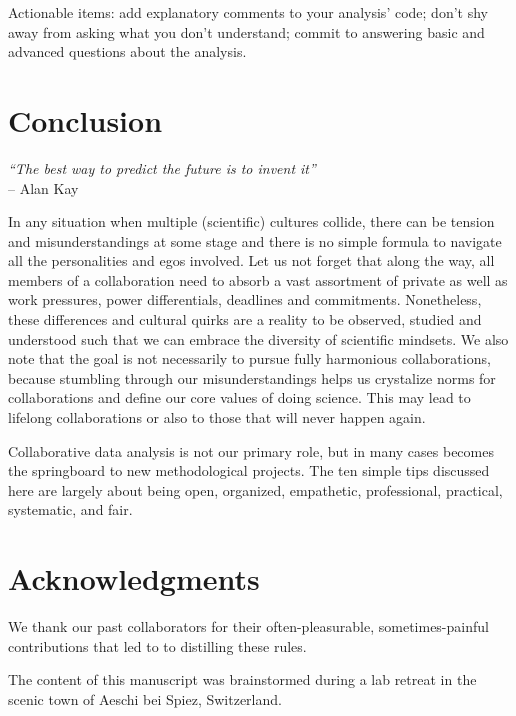 \documentclass{article}
\begin{document}
Actionable items: add explanatory comments to your analysis’ code; don’t shy away from asking what you don’t understand; commit to answering basic and advanced questions about the analysis.

\section*{Conclusion} %

\begin{flushright}
\rightskip=1cm\textit{``The best way to predict the future is to invent it''} \\
\vspace{.2em}
\rightskip=0cm -- Alan Kay
\end{flushright}

In any situation when multiple (scientific) cultures collide, there can be tension and misunderstandings at some stage and there is no simple formula to navigate all the personalities and egos involved. Let us not forget that along the way, all members of a collaboration need to absorb a vast assortment of private as well as work pressures, power differentials, deadlines and commitments. Nonetheless, these differences and cultural quirks are a reality to be observed, studied and understood such that we can embrace the diversity of scientific mindsets. We also note that the goal is not necessarily to pursue fully harmonious collaborations, because stumbling through our misunderstandings helps us crystalize norms for collaborations and define our core values of doing science. This may lead to lifelong collaborations or also to those that will never happen again.

Collaborative data analysis is not our primary role, but in many cases becomes the springboard to new methodological projects. The ten simple tips discussed here are largely about being open, organized, empathetic, professional, practical, systematic, and fair.

\section*{Acknowledgments} %

We thank our past collaborators for their often-pleasurable, sometimes-painful contributions that led to to distilling these rules.

The content of this manuscript was brainstormed during a lab retreat in the scenic town of Aeschi bei Spiez, Switzerland.
\end{document}
